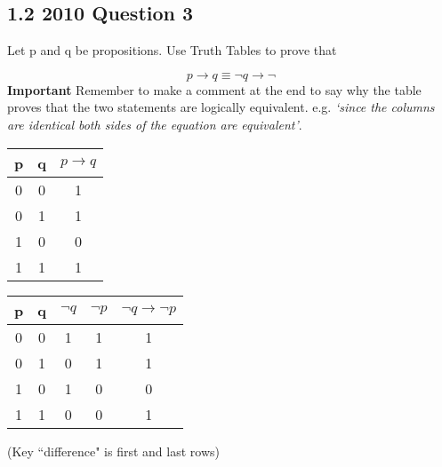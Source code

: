

\subsection*{1.2 2010 Question 3}

Let p and q be propositions. Use Truth Tables to prove that

\[ p \rightarrow q \equiv \neg q \rightarrow \neg\]
\textbf{Important} Remember to make a comment at the end to say why the table proves that the two statements are logically equivalent. e.g. \emph{‘since the columns are identical both sides of the equation are equivalent’}.
{ 
\begin{tabular}{|c|c||c|}
\hline  p&  q& $p \rightarrow q$ \\ 
\hline  0&  0&  1\\ 
\hline  0&  1&  1\\ 
\hline  1&  0&  0\\ 
\hline  1&  1&  1\\ 
\hline 
\end{tabular} \hspace{0.5cm} \begin{tabular}{|c|c||c|c|c|}
\hline  p&  q& $\neg q$ & $\neg p$ & $\neg q \rightarrow \neg p$ \\ 
\hline  0&  0& 1& 1& 1\\ 
\hline  0&  1& 0& 1& 1\\ 
\hline  1&  0& 1& 0& 0\\ 
\hline  1&  1& 0& 0& 1\\ 
\hline 
\end{tabular}
} 
(Key ``difference" is first and last rows)
